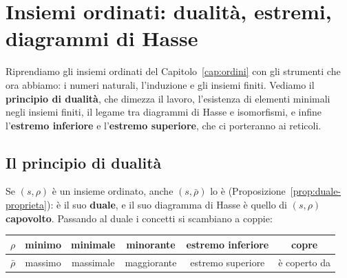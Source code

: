\chapter{Insiemi ordinati: dualità, estremi, diagrammi di Hasse}\label{cap:insiemi-ordinati}

Riprendiamo gli insiemi ordinati del Capitolo~\ref{cap:ordini} con gli strumenti che ora abbiamo: i numeri naturali, l'induzione
e gli insiemi finiti. Vediamo il \textbf{principio di dualità}, che dimezza il lavoro, l'esistenza di elementi minimali negli insiemi
finiti, il legame tra diagrammi di Hasse e isomorfismi, e infine l'\textbf{estremo inferiore} e l'\textbf{estremo superiore}, che ci
porteranno ai reticoli.

\section{Il principio di dualità}\label{sec:dualita-ordini}

Se $(s, \rho)$ è un insieme ordinato, anche $(s, \bar{\rho})$ lo è (Proposizione~\ref{prop:duale-proprieta}): è il suo \textbf{duale}, e il suo
diagramma di Hasse è quello di $(s, \rho)$ \textbf{capovolto}. Passando al duale i concetti si scambiano a coppie:
\begin{center}
\renewcommand{\arraystretch}{1.2}
\begin{tabular}{c|c|c|c|c|c}
    $\rho$ & minimo & minimale & minorante & estremo inferiore & copre \\ \hline
    $\bar{\rho}$ & massimo & massimale & maggiorante & estremo superiore & è coperto da \\
\end{tabular}
\end{center}


